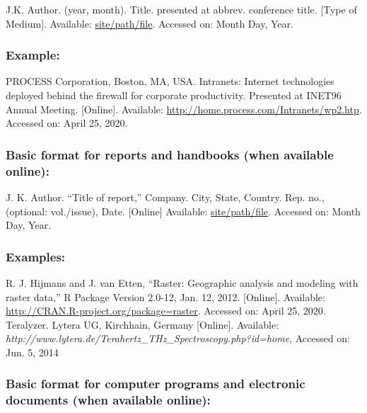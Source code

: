 \documentclass{IEEEoj}
\begin{document}
\begin{thebibliography}{00}
 J.K. Author. (year, month). Title. presented at abbrev. conference title.
[Type of Medium]. Available: \underline{site/path/file}. Accessed on: Month Day, Year.
\end{thebibliography}

\subsubsection*{Example:}

\begin{thebibliography}{00}
 PROCESS Corporation, Boston, MA, USA. Intranets: Internet technologies deployed behind the firewall for corporate productivity. Presented at INET96 Annual Meeting. [Online]. Available: \underline {http://home.process.com/Intranets/wp2.htp}. Accessed on: April 25, 2020.
\end{thebibliography}

\subsubsection*{Basic format for reports and handbooks (when available online): }

\begin{thebibliography}{00}
 J. K. Author. ``Title of report,'' Company. City, State, Country. Rep. no.,
(optional: vol./issue), Date. [Online] Available:
\underline{site/path/file}. Accessed
on: Month Day, Year.
\end{thebibliography}

\subsubsection*{Examples:}

\begin{thebibliography}{00}
 R. J. Hijmans and J. van Etten, ``Raster: Geographic analysis and modeling with raster data,'' R Package Version 2.0-12, Jan. 12, 2012. [Online]. Available: \underline {http://CRAN.R-project.org/package=raster}. Accessed on: April 25, 2020.
 Teralyzer. Lytera UG, Kirchhain, Germany [Online]. Available: \emph{http://www.lytera.de/Terahertz\_THz\_Spectroscopy.php?id=home}, Accessed on: Jun. 5, 2014
\end{thebibliography}

\subsubsection*{Basic format for computer programs and electronic documents (when available online): }
\end{document}
